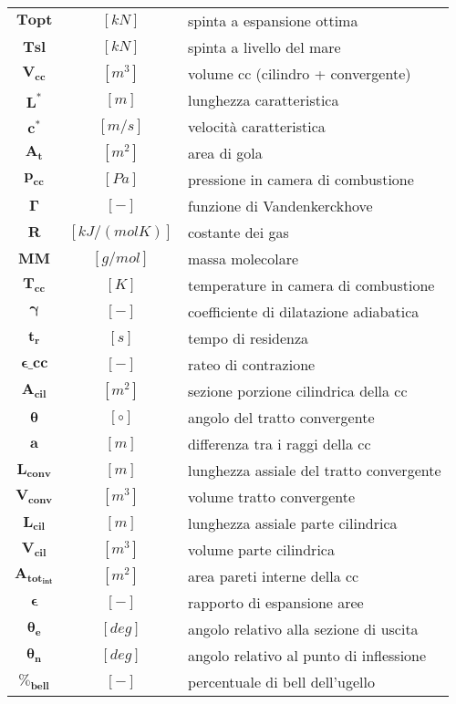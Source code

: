 \begin{multicols}{2}
\begin{tabularx}{\linewidth}{cc>{\raggedright\arraybackslash}X}
		$\bm{T{opt}}$ & $[kN]$ & spinta a espansione ottima \\
		$\bm{T{sl}}$ & $[kN]$ & spinta a livello del mare \\
		$\bm{V_{cc}  }$ & $[m^3]$ & volume cc (cilindro + convergente) \\
		$\bm{L^* }$ & $[m]$ & lunghezza caratteristica \\
		$\bm{c^* }$ & $[m/s]$ & velocità caratteristica \\
		$\bm{A_{t} }$ & $[m^2]$ & area di gola \\
	    $\bm{p_{cc} }$ & $[Pa]$ & pressione in camera di combustione \\
	    $\bm{\Gamma}$ & $[-]$ & funzione di Vandenkerckhove \\
		$\bm{R}$ & $[kJ/(molK)]$ & costante dei gas \\
	    $\bm{MM}$ & $[g/mol]$ & massa molecolare \\
	    $\bm{T_{cc} }$ & $[K]$ & temperature in camera di combustione \\
		$\bm{\gamma}$ & $[-]$ & coefficiente di dilatazione adiabatica \\
	    $\bm{t_{r} }$ & $[s]$ & tempo di residenza \\
	    $\bm{\epsilon\_{cc} }$ & $[-]$ & rateo di contrazione             \\
		$\bm{A_{cil} }$ & $[m^2]$ & sezione porzione cilindrica della cc \\
	    $\bm{\theta}$ & $[\circ]$ & angolo del tratto convergente   \\
	    $\bm{a}$ & $[m]$ & differenza tra i raggi della cc \\
		$\bm{L_{conv}}$ & $[m]$ & lunghezza assiale del tratto convergente \\
	    $\bm{V_{conv} }$ & $[m^3]$ & volume tratto convergente  \\
	    $\bm{L_{cil} }$ & $[m]$ & lunghezza assiale parte cilindrica \\
		$\bm{V_{cil} }$ & $[m^3]$ & volume parte cilindrica \\
	    $\bm{A_{tot_{int}}}$ & $[m^2]$ & area pareti interne della cc \\
		$\bm{\epsilon}$ & $[-]$ & rapporto di espansione aree \\
		$\bm{\theta_e}$ & $[deg]$ & angolo relativo alla sezione di uscita \\
		$\bm{\theta_n}$ & $[deg]$ & angolo relativo al punto di inflessione \\
                $\bm{\%_{bell} }$ & $[-]$ & percentuale di bell dell’ugello \\

\end{tabularx}
\end{multicols}
